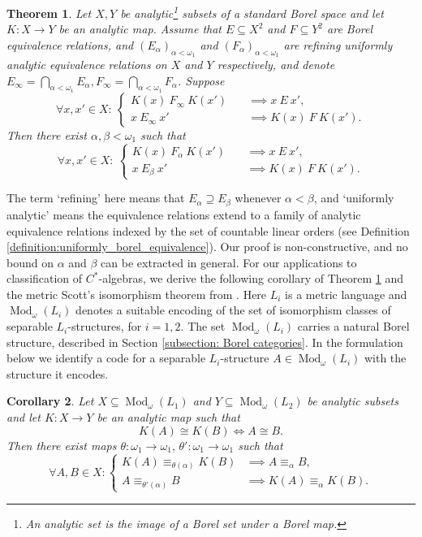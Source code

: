 \documentclass[12pt]{amsart}
\newtheorem{main}{Theorem}
\newtheorem{maincor}[main]{Corollary}
\DeclareMathOperator{\Mod}{Mod}
\begin{document}
\begin{main}\label{main2: DST transfer}
    Let $X, Y$ be analytic\footnote{An analytic set is the image of a Borel set under a Borel map.} subsets of a standard Borel space and let $K \colon X\to Y$ be an analytic map. Assume that $E\subseteq X^2$ and $F\subseteq Y^2$ are Borel equivalence relations, and $(E_\alpha)_{\alpha<\omega_1}$ and $(F_\alpha)_{\alpha<\omega_1}$ are refining uniformly analytic equivalence relations on $X$ and $Y$ respectively, and denote $E_{\infty} = \bigcap_{\alpha <\omega_1} E_\alpha, F_{\infty} = \bigcap_{\alpha <\omega_1} F_\alpha$. Suppose 
    \[ \forall x,x'\in X: \ \begin{cases}
         K(x) \  F_{\infty} \ K(x') \quad &\implies x \ E \ x' ,\\
         x \ E_\infty \ x'\quad &\implies K(x) \ F \ K(x').
    \end{cases}       
    \]
    Then there exist $\alpha,\beta<\omega_1$ such that 
    \[ \forall x,x'\in X: \ \begin{cases}
         K(x) \  F_{\alpha} \ K(x') \quad &\implies x \ E \ x' ,\\
         x \ E_{\beta} \ x'\quad &\implies K(x) \ F \ K(x').
    \end{cases}
    \]
\end{main}
The term `refining' here means that $E_\alpha\supseteq E_\beta$ whenever $\alpha<\beta$, and `uniformly analytic' means the equivalence relations extend to a family of analytic equivalence relations indexed by the set of countable linear orders (see Definition \ref{definition:uniformly_borel_equivalence}).
Our proof is non-constructive, and no bound on $\alpha$ and $\beta$ can be extracted in general. 
For our applications to classification of $C^*$-algebras, we derive the following corollary of Theorem \ref{main2: DST transfer} and the metric Scott's isomorphism theorem from \cite{yaacov2017metric}.  
Here $L_i$ is a metric language and $\Mod_\omega(L_i)$ denotes a suitable encoding of the set of isomorphism classes of separable $L_i$-structures, for $i=1,2$. The set $\Mod_\omega(L_i)$ carries a natural Borel structure, described in Section \ref{subsection: Borel categories}. 
In the formulation below we identify a code for a separable $L_i$-structure $A \in \Mod_\omega(L_i)$ with the structure it encodes.

\begin{maincor} \label{corollary:intro comparison of Scott degrees}
    Let $X\subseteq\Mod_\omega(L_1)$ and $Y\subseteq\Mod_\omega(L_2)$ be analytic subsets and let $K \colon X\to Y$ be an analytic map such that 
    \[ K(A) \cong K(B) \iff A \cong B. \]
    Then there exist maps $\theta\colon\omega_1\to\omega_1, \, \theta'\colon\omega_1\to\omega_1$ such that 
    \begin{equation*}
        \forall A,B\in X:
        \begin{cases}
            K(A) \equiv_{\theta(\alpha)} K(B)&\implies A\equiv_\alpha B, \\
            A\equiv_{\theta'(\alpha)}B&\implies K(A)\equiv_\alpha K(B).
        \end{cases}
    \end{equation*}
\end{maincor}
\end{document}
